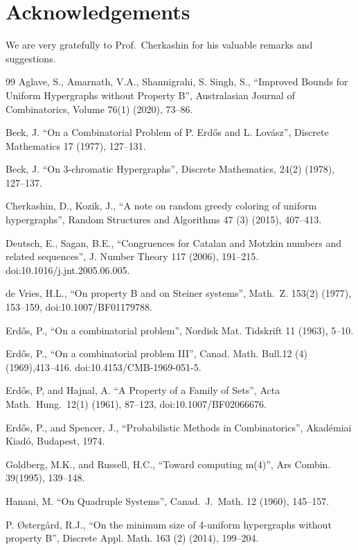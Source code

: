 \documentclass[a4paper,12pt]{article}
\begin{document}
\section{Acknowledgements}
We are very gratefully to Prof.\ Cherkashin for his valuable remarks and suggestions.
\begin{thebibliography}{99}
 Aglave, S.,  Amarnath, V.A., Shannigrahi, S. Singh, S., 
``Improved Bounds for Uniform Hypergraphs without Property B'',
Australasian Journal of Combinatorics, Volume 76(1) (2020), 73--86.

 Beck, J. ``On a Combinatorial Problem of P. Erdős and 
L. Lovász'', Discrete Mathematics 17 (1977), 127--131.

 Beck, J. ``On 3-chromatic Hypergraphs'', Discrete Mathematics,
24(2) (1978), 127--137.
   
 Cherkashin, D., Kozik, J.,
``A note on random greedy coloring of uniform hypergraphs'', 
Random Structures and Algorithms 47 (3) (2015), 407--413.

 Deutsch, E., Sagan, B.E., ``Congruences for Catalan
and Motzkin numbers and related sequences'', J. Number Theory 117 (2006),
191--215. doi:10.1016/j.jnt.2005.06.005.

 de Vries, H.L., ``On property B and on Steiner systems'',
Math.\ Z. 153(2) (1977), 153--159, doi:10.1007/BF01179788.

 Erdős, P., ``On a combinatorial problem'', 
Nordisk Mat. Tidskrift 11 (1963), 5--10.

 Erdős, P., ``On a combinatorial problem III'', 
Canad. Math. Bull.12 (4) (1969),413--416. doi:10.4153/CMB-1969-051-5.

 Erdős, P, and Hajnal, A. ``A Property of a Family of Sets'',
Acta Math.\ Hung.\ 12(1) (1961), 87--123, doi:10.1007/BF02066676.

 Erdős, P., and Spencer, J.,
``Probabilistic Methods in Combinatorics'', Akadémiai Kiadó, Budapest, 1974.

 Goldberg, M.K.,  and Russell, H.C.,
``Toward computing m(4)'', Ars Combin. 39(1995), 139--148.

 Hanani, M. ``On Quadruple Systems'', Canad.\ J.\ Math.
12 (1960), 145--157.

P. Østergård, R.J.,
``On the minimum size of 4-uniform hypergraphs without property B'', 
Discrete Appl. Math. 163 (2) (2014), 199--204.


\end{thebibliography}
\end{document}
